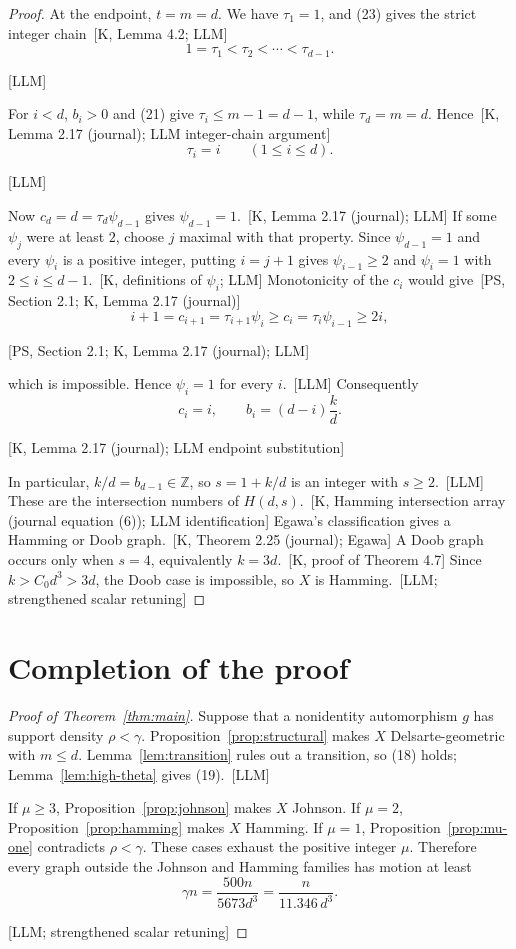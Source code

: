 \documentclass[10pt]{amsart}
\theoremstyle{remark}
\newcommand{\prov}[1]{\unskip\, {\normalfont\scriptsize\color{provgray}\textsf{[#1]}}}
\newcommand{\eqprov}[1]{%
  \par\nobreak\vspace{-0.68\baselineskip}%
  \noindent\hfill{\normalfont\scriptsize\color{provgray}\textsf{[#1]}}%
  \par\vspace{0.20\baselineskip}%
}
\begin{document}
\begin{proof}
At the endpoint, $t=m=d$. We have $\tau_1=1$, and (23) gives the strict integer chain\prov{K, Lemma 4.2; LLM}
\[
1=\tau_1<\tau_2<\cdots<\tau_{d-1}.
\]
\eqprov{LLM}
For $i<d$, $b_i>0$ and (21) give $\tau_i\le m-1=d-1$, while $\tau_d=m=d$. Hence\prov{K, Lemma 2.17 (journal); LLM integer-chain argument}
\[
\tau_i=i\qquad(1\le i\le d).
\]
\eqprov{LLM}
Now $c_d=d=\tau_d\psi_{d-1}$ gives $\psi_{d-1}=1$.\prov{K, Lemma 2.17 (journal); LLM} If some $\psi_j$ were at least $2$, choose $j$ maximal with that property. Since $\psi_{d-1}=1$ and every $\psi_i$ is a positive integer, putting $i=j+1$ gives $\psi_{i-1}\ge2$ and $\psi_i=1$ with $2\le i\le d-1$.\prov{K, definitions of $\psi_i$; LLM} Monotonicity of the $c_i$ would give\prov{PS, Section 2.1; K, Lemma 2.17 (journal)}
\[
i+1=c_{i+1}=\tau_{i+1}\psi_i\ge c_i=\tau_i\psi_{i-1}\ge2i,
\]
\eqprov{PS, Section 2.1; K, Lemma 2.17 (journal); LLM}
which is impossible. Hence $\psi_i=1$ for every $i$.\prov{LLM} Consequently
\[
c_i=i,
\qquad
b_i=(d-i)\frac{k}{d}.
\]
\eqprov{K, Lemma 2.17 (journal); LLM endpoint substitution}
In particular, $k/d=b_{d-1}\in\mathbb{Z}$, so $s=1+k/d$ is an integer with $s\ge2$.\prov{LLM} These are the intersection numbers of $H(d,s)$.\prov{K, Hamming intersection array (journal equation (6)); LLM identification} Egawa's classification gives a Hamming or Doob graph.\prov{K, Theorem 2.25 (journal); Egawa} A Doob graph occurs only when $s=4$, equivalently $k=3d$.\prov{K, proof of Theorem 4.7} Since $k>C_0d^3>3d$, the Doob case is impossible, so $X$ is Hamming.\prov{LLM; strengthened scalar retuning}
\end{proof}

\section{Completion of the proof}
\begin{proof}[Proof of Theorem~\ref{thm:main}]
Suppose that a nonidentity automorphism $g$ has support density $\rho<\gamma$. Proposition~\ref{prop:structural} makes $X$ Delsarte-geometric with $m\le d$. Lemma~\ref{lem:transition} rules out a transition, so (18) holds; Lemma~\ref{lem:high-theta} gives (19).\prov{LLM}

If $\mu\ge3$, Proposition~\ref{prop:johnson} makes $X$ Johnson. If $\mu=2$, Proposition~\ref{prop:hamming} makes $X$ Hamming. If $\mu=1$, Proposition~\ref{prop:mu-one} contradicts $\rho<\gamma$. These cases exhaust the positive integer $\mu$. Therefore every graph outside the Johnson and Hamming families has motion at least
\[
\gamma n=\frac{500n}{5673d^3}=\frac{n}{11.346\,d^3}.
\]
\eqprov{LLM; strengthened scalar retuning}
\end{proof}
\end{document}
